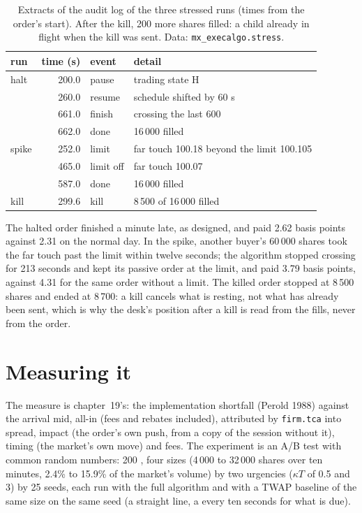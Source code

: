 \begin{table}[ht]
\centering
\small
\begin{tabular}{@{}lrll@{}}
\toprule
run & time (s) & event & detail \\
\midrule
halt & 200.0 & pause & trading state H \\
 & 260.0 & resume & schedule shifted by 60 s \\
 & 661.0 & finish & crossing the last 600 \\
 & 662.0 & done & 16\,000 filled \\
spike & 252.0 & limit & far touch 100.18 beyond the limit 100.105 \\
 & 465.0 & limit off & far touch 100.07 \\
 & 587.0 & done & 16\,000 filled \\
kill & 299.6 & kill & 8\,500 of 16\,000 filled \\
\bottomrule
\end{tabular}
\caption{Extracts of the audit log of the three stressed runs (times from the order's start). After the kill, 200 more shares filled: a child
already in flight when the kill was sent. Data: \texttt{mx\_execalgo.stress}.}\label{tab:mx:build-an-execution-algorithm:log}
\end{table}

The halted order finished a minute late, as designed, and paid 2.62 basis points against 2.31 on the normal day. In the spike, another buyer's 60\,000
shares took the far touch past the limit within twelve seconds; the algorithm stopped crossing for 213 seconds and kept its passive order at the limit,
and paid 3.79 basis points, against 4.31 for the same order without a limit. The killed order stopped at 8\,500 shares and ended at 8\,700: a kill
cancels what is resting, not what has already been sent, which is why the desk's position after a kill is read from the fills, never from the order.

\section{Measuring it}

The measure is chapter~19's: the implementation shortfall (Perold 1988) against the arrival mid, all-in (fees and rebates included), attributed by
\texttt{firm.tca} into spread, impact (the order's own push, from a copy of the session without it), timing (the market's own move) and fees. The
experiment is an A/B test with common random numbers: 200 , four sizes (4\,000 to 32\,000 shares over ten minutes, 2.4\% to 15.9\% of the
market's volume) by two urgencies ($\kappa T$ of 0.5 and 3) by 25 seeds, each run with the full algorithm and with a TWAP baseline of the same size on the
same seed (a straight line, a  every ten seconds for what is due).

